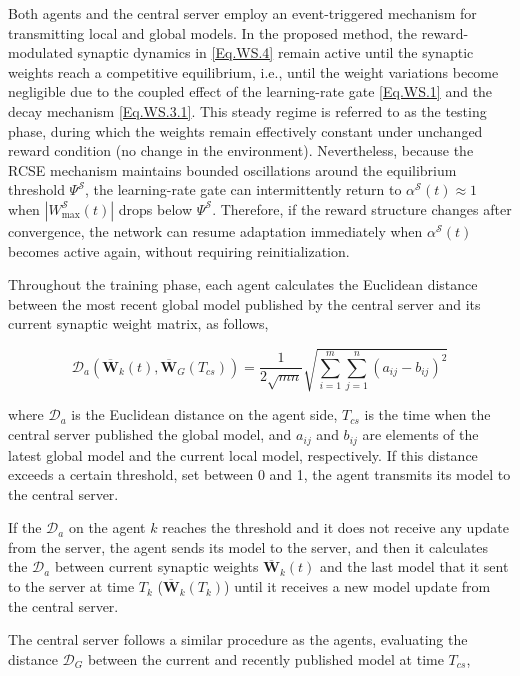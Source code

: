 Both agents and the central server employ an event-triggered mechanism for transmitting local and global models. In the proposed method, the reward-modulated synaptic dynamics in \eqref{Eq.WS.4} remain active until the synaptic weights reach a competitive equilibrium, i.e., until the weight variations become negligible due to the coupled effect of the learning-rate gate \eqref{Eq.WS.1} and the decay mechanism \eqref{Eq.WS.3.1}. This steady regime is referred to as the testing phase, during which the weights remain effectively constant under unchanged reward condition (no change in the environment). Nevertheless, because the \ac{RCSE} mechanism maintains bounded oscillations around the equilibrium threshold $\Psi^{\mathcal{S}}$, the learning-rate gate can intermittently return to $\alpha^{\mathcal{S}}(t)\approx 1$ when $|W^{\mathcal{S}}_{\max}(t)|$ drops below $\Psi^{\mathcal{S}}$. Therefore, if the reward structure changes after convergence, the network can resume adaptation immediately when $\alpha^{\mathcal{S}}(t)$ becomes active again, without requiring reinitialization.

Throughout the training phase, each agent calculates the Euclidean distance between the most recent global model published by the central server and its current synaptic weight matrix, as follows,


\begin{equation} \label{Eq.AFL.4}
\mathcal{D}_{a}(\bm{\overline{W}}_{k}(t), \bm{\overline{W}}_{G}(T_{cs})) = \frac{1}{2 \sqrt{mn}}\sqrt{\sum_{i=1}^{m}\sum_{j=1}^{n} (a_{ij} - b_{ij})^2}
\end{equation}

\noindent where \(\mathcal{D}_{a}\) is the Euclidean distance on the agent side, \(T_{cs}\) is the time when the central server published the global model, and \(a_{ij}\) and \(b_{ij}\) are elements of the latest global model and the current local model, respectively. If this distance exceeds a certain threshold, set between 0 and 1, the agent transmits its model to the central server. 

If the \(\mathcal{D}_{a}\) on the agent \(k\) reaches the threshold and it does not receive any update from the server, the agent sends its model to the server, and then it calculates the \(\mathcal{D}_{a}\) between current synaptic weights \(\bm{\overline{W}}_{k}(t)\) and the last model that it sent to the server at time \(T_k\) (\(\bm{\overline{W}}_{k}(T_{k})\)) until it receives a new model update from the central server.

The central server follows a similar procedure as the agents, evaluating the distance \(\mathcal{D}_{G}\) between the current and recently published model at time \(T_{cs}\),

